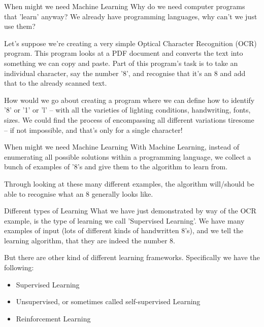 \documentclass[10pt]{beamer}
\begin{document}
\begin{frame}[label={sec:orga9af61c}]{When might we need Machine Learning}
Why do we need computer programs that 'learn' anyway? We already have programming
languages, why can't we just use them?

Let's suppose we're creating a very simple Optical Character Recognition (OCR)
program. This program looks at a PDF document and converts the text into something we
can copy and paste. Part of this program's task is to take an individual character,
say the number '8', and recognise that it's an 8 and add that to the already scanned
text.

How would we go about creating a program where we can define how to identify '8' or
'1' or 'l' -- with all the varieties of lighting conditions, handwriting, fonts,
sizes. We could find the process of encompassing all different variations tiresome --
if not impossible, and that's only for a single character!
\end{frame}

\begin{frame}[label={sec:orga5a503d}]{When might we need Machine Learning}
With Machine Learning, instead of enumerating all possible solutions within a
programming language, we collect a bunch of examples of '8's and give them to the
algorithm to learn from.

Through looking at these many different examples, the algorithm will/should be able
to recognise what an 8 generally looks like.
\end{frame}

\begin{frame}[label={sec:orgf310e64}]{Different types of Learning}
What we have just demonstrated by way of the OCR example, is the type of learning we
call 'Supervised Learning'. We have many examples of input (lots of different kinds
of handwritten 8's), and we tell the learning algorithm, that they are indeed the
number 8.

But there are other kind of different learning frameworks. Specifically we have the
following:

\begin{itemize}
\item Supervised Learning
\item Unsupervised, or sometimes called self-supervised Learning
\item Reinforcement Learning
\end{itemize}
\end{frame}
\end{document}

